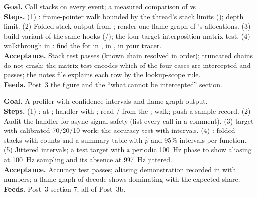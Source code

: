 \textbf{Goal.} Call stacks on every event; a measured comparison of  vs .\\
\textbf{Steps.} (1) : frame-pointer walk bounded by the thread's stack limits (); depth limit. (2) Folded-stack output from ; render one flame graph of 's allocations. (3)  build variant of the same hooks (/); the four-target interposition matrix test. (4)  walkthrough in : find the  for  in , in , in your tracer.\\
\textbf{Acceptance.} Stack test passes (known chain resolved in order); truncated chains do not crash; the matrix test encodes which of the four cases are intercepted and passes; the notes file explains each row by the lookup-scope rule.\\
\textbf{Feeds.} Post~3 the  figure and the ``what cannot be intercepted'' section.

\textbf{Goal.} A  profiler with confidence intervals and flame-graph output.\\
\textbf{Steps.} (1) :  at ;  handler with ; read / from the ; walk; push a sample record. (2) Audit the handler for async-signal safety (list every call in a comment). (3)  target with calibrated 70/20/10 work; the accuracy test with intervals. (4) : folded stacks with counts and a summary table with $\hat{p}$ and 95\% intervals per function. (5) Jittered intervals; a test target with a periodic 100~Hz phase to show aliasing at 100~Hz sampling and its absence at 997~Hz jittered.\\
\textbf{Acceptance.} Accuracy test passes; aliasing demonstration recorded in  with numbers; a flame graph of  decode shows  dominating with the expected share.\\
\textbf{Feeds.} Post~3 section 7; all of Post~3b.

